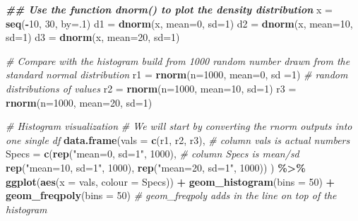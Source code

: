 \documentclass[
]{book}
\newenvironment{Shaded}{\begin{snugshade}}{\end{snugshade}}
\newcommand{\AttributeTok}[1]{\textcolor[rgb]{0.13,0.29,0.53}{#1}}
\newcommand{\CommentTok}[1]{\textcolor[rgb]{0.56,0.35,0.01}{\textit{#1}}}
\newcommand{\DecValTok}[1]{\textcolor[rgb]{0.00,0.00,0.81}{#1}}
\newcommand{\DocumentationTok}[1]{\textcolor[rgb]{0.56,0.35,0.01}{\textbf{\textit{#1}}}}
\newcommand{\FunctionTok}[1]{\textcolor[rgb]{0.13,0.29,0.53}{\textbf{#1}}}
\newcommand{\NormalTok}[1]{#1}
\newcommand{\OtherTok}[1]{\textcolor[rgb]{0.56,0.35,0.01}{#1}}
\newcommand{\SpecialCharTok}[1]{\textcolor[rgb]{0.81,0.36,0.00}{\textbf{#1}}}
\newcommand{\StringTok}[1]{\textcolor[rgb]{0.31,0.60,0.02}{#1}}
\begin{document}
\begin{Shaded}
\begin{Highlighting}[]
\DocumentationTok{\#\# Use the function \textasciigrave{}dnorm()\textasciigrave{} to plot the density distribution}
\NormalTok{x }\OtherTok{=} \FunctionTok{seq}\NormalTok{(}\SpecialCharTok{{-}}\DecValTok{10}\NormalTok{, }\DecValTok{30}\NormalTok{, }\AttributeTok{by=}\NormalTok{.}\DecValTok{1}\NormalTok{)}
\NormalTok{d1 }\OtherTok{=} \FunctionTok{dnorm}\NormalTok{(x, }\AttributeTok{mean=}\DecValTok{0}\NormalTok{, }\AttributeTok{sd=}\DecValTok{1}\NormalTok{)}
\NormalTok{d2 }\OtherTok{=} \FunctionTok{dnorm}\NormalTok{(x, }\AttributeTok{mean=}\DecValTok{10}\NormalTok{, }\AttributeTok{sd=}\DecValTok{1}\NormalTok{)}
\NormalTok{d3 }\OtherTok{=} \FunctionTok{dnorm}\NormalTok{(x, }\AttributeTok{mean=}\DecValTok{20}\NormalTok{, }\AttributeTok{sd=}\DecValTok{1}\NormalTok{)}

\CommentTok{\# Compare with the histogram build from 1000 random number drawn from the standard normal distribution}
\NormalTok{r1 }\OtherTok{=} \FunctionTok{rnorm}\NormalTok{(}\AttributeTok{n=}\DecValTok{1000}\NormalTok{, }\AttributeTok{mean=}\DecValTok{0}\NormalTok{, }\AttributeTok{sd =}\DecValTok{1}\NormalTok{)  }\CommentTok{\# random distributions of values}
\NormalTok{r2 }\OtherTok{=} \FunctionTok{rnorm}\NormalTok{(}\AttributeTok{n=}\DecValTok{1000}\NormalTok{, }\AttributeTok{mean=}\DecValTok{10}\NormalTok{, }\AttributeTok{sd=}\DecValTok{1}\NormalTok{)}
\NormalTok{r3 }\OtherTok{=} \FunctionTok{rnorm}\NormalTok{(}\AttributeTok{n=}\DecValTok{1000}\NormalTok{, }\AttributeTok{mean=}\DecValTok{20}\NormalTok{, }\AttributeTok{sd=}\DecValTok{1}\NormalTok{)}

\CommentTok{\# Histogram visualization}
\CommentTok{\# We will start by converting the rnorm outputs into one single df}
\FunctionTok{data.frame}\NormalTok{(}\AttributeTok{vals =} \FunctionTok{c}\NormalTok{(r1, r2, r3), }\CommentTok{\# column vals is actual numbers}
           \AttributeTok{Specs =} \FunctionTok{c}\NormalTok{(}\FunctionTok{rep}\NormalTok{(}\StringTok{"mean=0, sd=1"}\NormalTok{, }\DecValTok{1000}\NormalTok{), }\CommentTok{\# column Specs is mean/sd }
                     \FunctionTok{rep}\NormalTok{(}\StringTok{"mean=10, sd=1"}\NormalTok{, }\DecValTok{1000}\NormalTok{),}
                     \FunctionTok{rep}\NormalTok{(}\StringTok{"mean=20, sd=1"}\NormalTok{, }\DecValTok{1000}\NormalTok{))}
\NormalTok{             ) }\SpecialCharTok{\%\textgreater{}\%}
  \FunctionTok{ggplot}\NormalTok{(}\FunctionTok{aes}\NormalTok{(}\AttributeTok{x =}\NormalTok{ vals, }
             \AttributeTok{colour =}\NormalTok{ Specs)) }\SpecialCharTok{+}
  \FunctionTok{geom\_histogram}\NormalTok{(}\AttributeTok{bins =} \DecValTok{50}\NormalTok{) }\SpecialCharTok{+} 
  \FunctionTok{geom\_freqpoly}\NormalTok{(}\AttributeTok{bins =} \DecValTok{50}\NormalTok{) }\CommentTok{\# geom\_freqpoly adds in the line on top of the histogram}
\end{Highlighting}
\end{Shaded}
\end{document}
